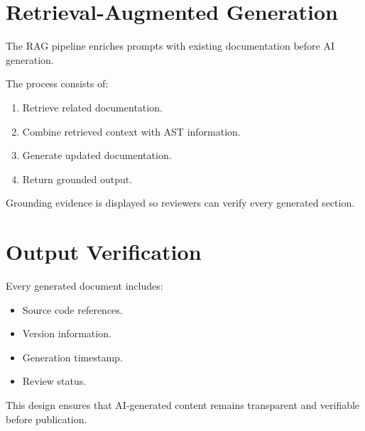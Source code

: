 
\section{Retrieval-Augmented Generation}

The RAG pipeline enriches prompts with existing documentation before AI generation.

The process consists of:

\begin{enumerate}
    \item Retrieve related documentation.
    \item Combine retrieved context with AST information.
    \item Generate updated documentation.
    \item Return grounded output.
\end{enumerate}

Grounding evidence is displayed so reviewers can verify every generated section.


\section{Output Verification}

Every generated document includes:

\begin{itemize}
    \item Source code references.
    \item Version information.
    \item Generation timestamp.
    \item Review status.
\end{itemize}

This design ensures that AI-generated content remains transparent and verifiable before publication.